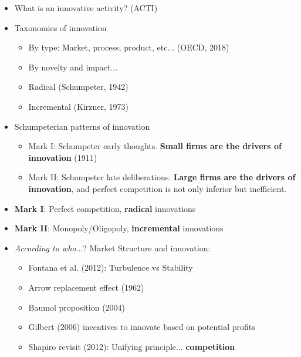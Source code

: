 \documentclass{beamer}
\begin{document}
\begin{frame}[allowframebreaks]
\begin{itemize}
\begin{itemize}
				\item What is an innovative activity? (ACTI)
			\end{itemize}
		\end{itemize}
	\pagebreak
		\begin{itemize}
			\item Taxonomies of innovation
			\begin{itemize}
				\item By type: Market, process, product, etc... (OECD, 2018)
				\item By novelty and impact...
				\item Radical (Schumpeter, 1942)
				\item Incremental (Kirzner, 1973)
			\end{itemize}
		\end{itemize}
		\pagebreak
		\begin{itemize}
			\item Schumpeterian patterns of innovation
			\begin{itemize}
				\item Mark I: Schumpeter early thoughts. \textbf{Small firms are the drivers of innovation} (1911)
				\item Mark II: Schumpeter late deliberations. \textbf{Large firms are the drivers of innovation}, and perfect competition is not only inferior but inefficient.
			\end{itemize}
		\end{itemize}
		\pagebreak
		\begin{itemize}			
			\item \textbf{Mark I}: Perfect competition, \textbf{radical} innovations
			\item \textbf{Mark II}: Monopoly/Oligopoly, \textbf{incremental} innovations
			\item \textit{According to who}...? Market Structure and innovation:
			\begin{itemize}
				\item Fontana et al. (2012): Turbulence vs Stability
				\item Arrow replacement effect (1962)
				\item Baumol proposition (2004)
				\item Gilbert (2006) incentives to innovate based on potential profits
				\item Shapiro revisit (2012): Unifying principle... \textbf{competition}
			\end{itemize}
		\end{itemize}
	\end{frame}
\end{document}
